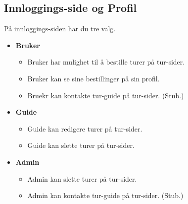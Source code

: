 \documentclass[../doc]{subfiles}
\begin{document}
\subsection{Innloggings-side og Profil}
På innloggings-siden har du tre valg. 
\begin{itemize}
    \item \textbf{Bruker}
    \begin{itemize}
        \item Bruker har mulighet til å bestille turer på tur-sider.
        \item Bruker kan se sine bestillinger på sin profil.
        \item Bruekr kan kontakte tur-guide på tur-sider. (Stub.)
    \end{itemize}
    \item \textbf{Guide}
    \begin{itemize}
        \item Guide kan redigere turer på tur-sider.
        \item Guide kan slette turer på tur-sider.
    \end{itemize}
    \item \textbf{Admin}
    \begin{itemize}
        \item Admin kan slette turer på tur-sider.
        \item Admin kan kontakte tur-guide på tur-sider. (Stub.)
    \end{itemize}
\end{itemize}
\end{document}
